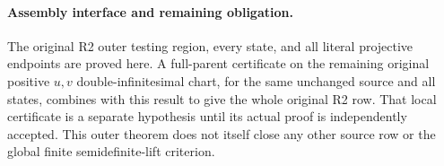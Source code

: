 \paragraph{Assembly interface and remaining obligation.}
The original R2 outer testing region, every state, and all literal
projective endpoints are proved here.  A full-parent certificate on the
remaining original positive $u,v$ double-infinitesimal chart, for the
same unchanged source and all states, combines with this result to give
the whole original R2 row.  That local certificate is a separate
hypothesis until its actual proof is independently accepted.  This
outer theorem does not itself close any other source row or the global
finite semidefinite-lift criterion.
